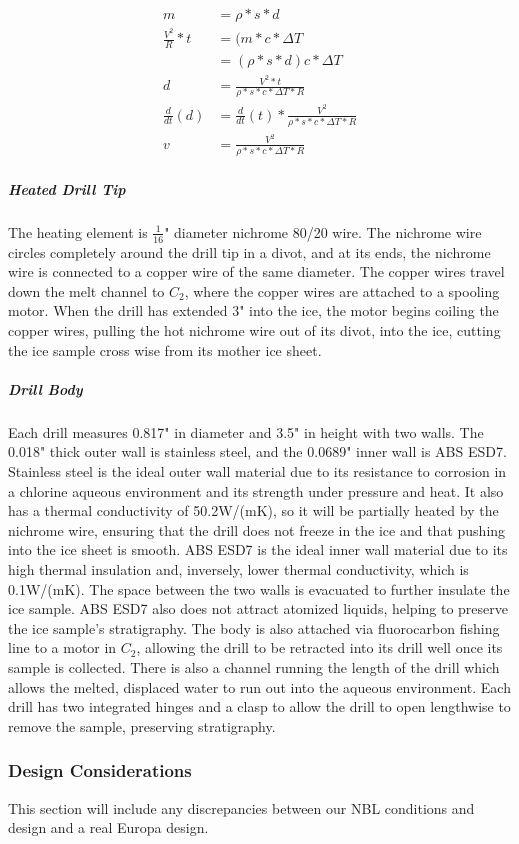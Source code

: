 \documentclass{article}
\begin{document}
\begin{align*}
    m &= \rho * s*d \\
    \frac{V^2}{R}*t &= (m*c*\Delta T \\
    &= (\rho * s*d) c * \Delta T \\
    d &= \frac{V^2 * t}{\rho *s*c*\Delta T*R} \\
    \frac{d}{dt}(d) &= \frac{d}{dt}(t)* \frac{V^2}{\rho *s*c*\Delta T*R} \\
    v &= \frac{V^2}{\rho *s*c*\Delta T*R}
\end{align*}

\subparagraph{Heated Drill Tip}
The heating element is $\frac{1}{16}$" diameter nichrome 80/20 wire. The nichrome wire circles completely around the drill tip in a divot, and at its ends, the nichrome wire is connected to a copper wire of the same diameter. The copper wires travel down the melt channel to $C_2$, where the copper wires are attached to a spooling motor. When the drill has extended 3" into the ice, the motor begins coiling the copper wires, pulling the hot nichrome wire out of its divot, into the ice, cutting the ice sample cross wise from its mother ice sheet.
\subparagraph{Drill Body}
Each drill measures 0.817" in diameter and 3.5" in height with two walls. The 0.018" thick outer wall is stainless steel, and the 0.0689" inner wall is ABS ESD7. Stainless steel is the ideal outer wall material due to its resistance to corrosion in a chlorine aqueous environment and its strength under pressure and heat. It also has a thermal conductivity of 50.2W/(mK), so it will be partially heated by the nichrome wire, ensuring that the drill does not freeze in the ice and that pushing into the ice sheet is smooth. ABS ESD7 is the ideal inner wall material due to its high thermal insulation and, inversely, lower thermal conductivity, which is 0.1W/(mK). The space between the two walls is evacuated to further insulate the ice sample. ABS ESD7 also does not attract atomized liquids, helping to preserve the ice sample’s stratigraphy. The body is also attached via fluorocarbon fishing line to a motor in $C_2$, allowing the drill to be retracted into its drill well once its sample is collected. There is also a channel running the length of the drill which allows the melted, displaced water to run out into the aqueous environment. Each drill has two integrated hinges and a clasp to allow the drill to open lengthwise to remove the sample, preserving stratigraphy.

\subsubsection{Design Considerations}
This section will include any discrepancies between our NBL conditions and design and a real Europa design.
\end{document}
